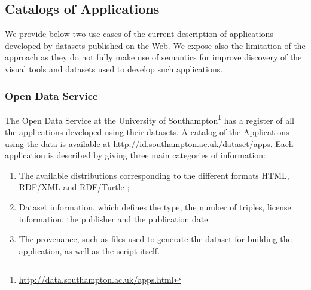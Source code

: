 \subsection{Catalogs of Applications}
We provide below two use cases of the current description of applications developed by datasets published on the Web. We expose also the limitation of the approach as they do not fully make use of semantics for improve discovery of the visual tools and datasets used to develop such applications.

\subsubsection{Open Data Service}
The Open Data Service at the University of Southampton\footnote{\url{http://data.southampton.ac.uk/apps.html}} has a register of all the applications developed using their datasets. A catalog of the Applications using the data is available at \url{http://id.southampton.ac.uk/dataset/apps}. Each application is described by giving three main categories of information:
\begin{enumerate}
\item The available distributions corresponding to the different formats HTML, RDF/XML and RDF/Turtle ;
\item Dataset information, which defines the type, the number of triples, license information, the publisher and the publication date.
\item The provenance, such as files used to generate the dataset for building the application, as well as the script itself.
\end{enumerate}

